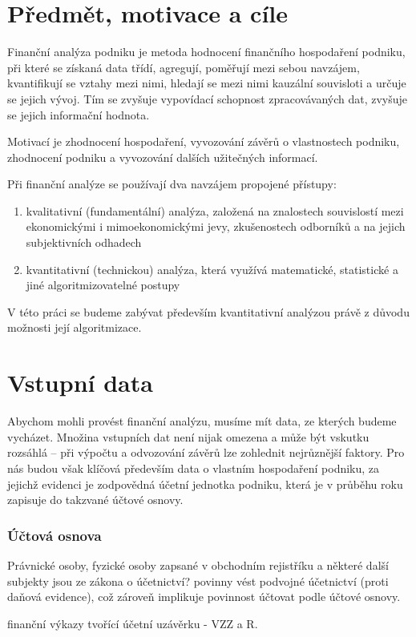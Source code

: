 \section{Předmět, motivace a cíle}
Finanční analýza podniku je metoda hodnocení finančního hospodaření podniku, při které se získaná data třídí, agregují, poměřují mezi sebou navzájem, kvantifikují se vztahy mezi nimi, hledají se mezi nimi kauzální souvisloti a určuje se jejich vývoj. Tím se zvyšuje vypovídací schopnost zpracovávaných dat, zvyšuje se jejich informační hodnota\cite{sedl}.

Motivací je zhodnocení hospodaření, vyvozování závěrů o vlastnostech podniku, zhodnocení podniku a vyvozování dalších užitečných informací.

Při finanční analýze se používají dva navzájem propojené přístupy\cite{kova}:
\begin{enumerate}
	\item kvalitativní (fundamentální) analýza, založená na znalostech souvislostí mezi ekonomickými i mimoekonomickými jevy, zkušenostech odborníků a na jejich subjektivních odhadech
	\item kvantitativní (technickou) analýza, která využívá matematické, statistické a jiné algoritmizovatelné postupy
\end{enumerate}
V této práci se budeme zabývat především kvantitativní analýzou právě z důvodu možnosti její algoritmizace.

\section{Vstupní data}
Abychom mohli provést finanční analýzu, musíme mít data, ze kterých budeme vycházet. Množina vstupních dat není nijak omezena a může být vskutku rozsáhlá -- při výpočtu a odvozování závěrů lze zohlednit nejrůznější faktory. Pro nás budou však klíčová především data o vlastním hospodaření podniku, za jejichž evidenci je zodpovědná účetní jednotka podniku, která je v průběhu roku zapisuje do takzvané účtové osnovy.
\subsubsection{Účtová osnova}
Právnické osoby, fyzické osoby zapsané v obchodním rejistříku a některé další subjekty jsou ze zákona o účetnictví? povinny vést podvojné účetnictví (proti daňová evidence), což zároveň implikuje povinnost účtovat podle účtové osnovy.

finanční výkazy tvořící účetní uzávěrku - VZZ a R.

